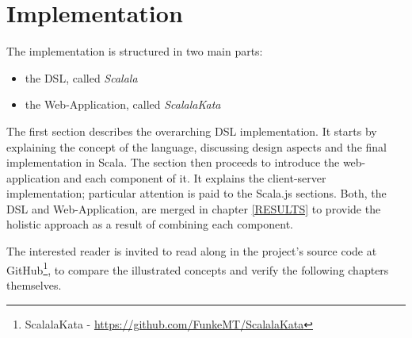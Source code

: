 \chapter{Implementation}
\label{IMPL}
The implementation is structured in two main parts:

\begin{itemize}
\item the DSL, called \textit{Scalala}
\item the Web-Application, called \textit{ScalalaKata}
\end{itemize}

The first section describes the overarching DSL implementation. It starts by explaining the concept of the language, discussing design aspects and the final implementation in Scala. The section then proceeds to introduce the web-application and each component of it. It explains the client-server implementation; particular attention is paid to the Scala.js sections. Both, the DSL and Web-Application, are merged in chapter \ref{RESULTS} to provide the holistic approach as a result of combining each component.

The interested reader is invited to read along in the project's source code at GitHub\footnote{ScalalaKata - \url{https://github.com/FunkeMT/ScalalaKata}}, to compare the illustrated concepts and verify the following chapters themselves.


